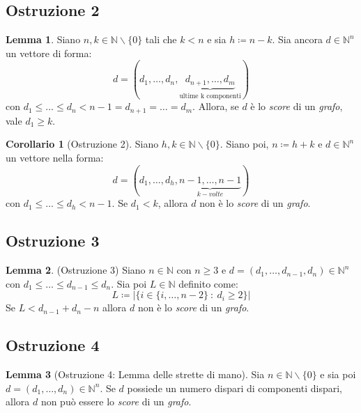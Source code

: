 \documentclass[12pt, a4paper]{report}
\newcommand{\N}{\mathbb{N}}
\theoremstyle{definition}
\newtheorem{corollary}{Corollario}[section]
\newtheorem{lemma}{Lemma}[section]
\begin{document}
\subsection{Ostruzione 2}
\begin{lemma}
    Siano $n,k\in\N\backslash\{0\}$ tali che $k<n$ e sia $h\coloneqq n-k$. Sia
    ancora $d\in\N^n$ un vettore di forma:
    \[d=(d_1,\dots,d_n,\underbrace{d_{n+1},\dots,d_m}_{\text{ultime k componenti}})\]
    con $d_1\leq\dots\leq d_n<n-1=d_{n+1}=\dots=d_m$. Allora, se $d$ è lo \emph{score}
    di un \emph{grafo}, vale $d_1\geq k$.
\end{lemma}
\begin{corollary}[Ostruzione 2]
    Siano $h,k\in\N\backslash\{0\}$. Siano poi, $n\coloneqq h+k$ e $d\in\N^n$ un
    vettore nella forma:
    \[d=(d_1,\dots,d_h,\underbrace{n-1,\dots,n-1}_{k-volte})\]
    con $d_1\leq\dots\leq d_h<n-1$. Se $d_1<k$, allora $d$ non è lo \emph{score} di
    un \emph{grafo}.
\end{corollary}

\subsection{Ostruzione 3}
\begin{lemma}(Ostruzione 3)
    Siano $n\in\N$ con $n\geq 3$ e $d=(d_1,\dots,d_{n-1},d_n)\in\N^n$ con
    $d_1\leq\dots\leq d_{n-1}\leq d_n$. Sia poi $L\in\N$ definito come:
    \[L\coloneqq|\{i\in\{i,\dots,n-2\}\ :\ d_i\geq 2\}|\]
    Se $L<d_{n-1}+d_n-n$ allora $d$ non è lo \emph{score} di un \emph{grafo}.
\end{lemma}

\subsection{Ostruzione 4}
\begin{lemma}[Ostruzione 4: Lemma delle strette di mano]
    Sia $n\in\N\backslash\{0\}$ e sia poi $d=(d_1,\dots,d_n)\in\N^n$. Se $d$
    possiede un numero dispari di componenti dispari, allora $d$ non può essere lo
    \emph{score} di un \emph{grafo}.
\end{lemma}
\end{document}
